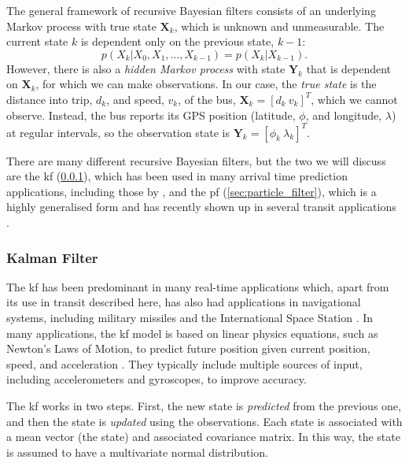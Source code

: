 \documentclass[12pt,a4paper]{article}
\newcommand{\bY}{\mathbf{Y}}
\newcommand{\bX}{\mathbf{X}}
\begin{document}
The general framework of recursive Bayesian filters consists of an
underlying Markov process with true state $\bX_k$, which is unknown and unmeasurable.
The current state $k$ is dependent only on the previous state, $k-1$:
\begin{equation}
  \label{eq:markov_state}
  p(X_k | X_0, X_1, \ldots, X_{k-1}) = p(X_k | X_{k-1}).
\end{equation}
However, there is also a \emph{hidden Markov process}
with state $\bY_k$ that is dependent on $\bX_k$, 
for which we can make observations.
In our case, the \emph{true state} is the distance into trip, $d_k$, 
and speed, $v_k$, of the bus,
$\bX_k = [d_k\ v_k]^T$, which we cannot observe.
Instead, the bus reports its GPS position
(latitude, $\phi$, and longitude, $\lambda$) at regular intervals,
so the observation state is $\bY_k = [\phi_k\ \lambda_k]^T$.


There are many different recursive Bayesian filters,
but the two we will discuss are the \gls{kf} (\cref{sec:kalman_filter}),
which has been used in many arrival time prediction applications,
including those by \cite{cn},
and the \gls{pf} (\cref{sec:particle_filter}), 
which is a highly generalised form and has recently
shown up in several transit applications \citep{cn}.



\subsubsection{Kalman Filter}
\label{sec:kalman_filter}

The \gls{kf} has been predominant in 
many real-time applications which, apart from its use in transit described here,
has also had applications in navigational systems, including military
missiles and the International Space Station \citep{cn}.
In many applications, the \gls{kf} model is based on linear physics equations,
such as Newton's Laws of Motion, to predict future position
given current position, speed, and acceleration \citep{cn}.
They typically include multiple sources of input, 
including accelerometers and gyroscopes, to improve accuracy.


The \gls{kf} works in two steps.
First, the new state is \emph{predicted} from the previous one,
and then the state is \emph{updated} using the observations.
Each state is associated with a mean vector (the state) and associated covariance matrix.
In this way, the state is assumed to have a multivariate normal distribution.
\end{document}
